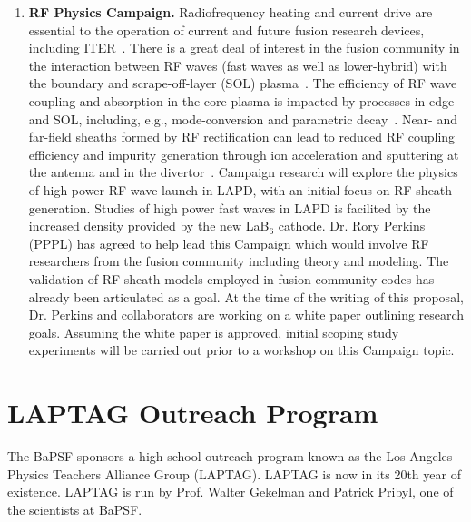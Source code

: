 \documentclass[11pt]{article}
\renewcommand{\cite}{\citep}
\begin{document}
\begin{enumerate}
\item {\bfseries RF Physics Campaign.} Radiofrequency heating and
  current drive are essential to the operation of current and future
  fusion research devices, including ITER~\cite{jaeger:2008}.  There is a great deal of
  interest in the fusion community in the interaction between RF waves
  (fast waves as well as lower-hybrid) with the boundary and
  scrape-off-layer (SOL) plasma~\cite{wallae:2011,jacquet:2011}.  The efficiency of RF wave coupling and
  absorption in the core plasma is impacted by processes in edge and
  SOL, including, e.g., mode-conversion and parametric decay~\cite{wukitch:2007,rost:2002}.  Near-
  and far-field sheaths formed by RF rectification can lead to reduced
  RF coupling efficiency and impurity generation through ion
  acceleration and sputtering at the antenna and in the divertor~\cite{ochoukov:2013,dippolito:2013}.
  Campaign research will explore the physics of high power RF wave
  launch in LAPD, with an initial focus on RF sheath generation.
  Studies of high power fast waves in LAPD is facilited by the
  increased density provided by the new LaB$_6$ cathode.  Dr. Rory
  Perkins (PPPL) has agreed to help lead this Campaign which would
  involve RF researchers from the fusion community including theory
  and modeling.  The validation of RF sheath models employed in fusion
  community codes has already been articulated as a goal.  At the time of
  the writing of this proposal, Dr. Perkins and collaborators are working on a
  white paper outlining research goals.  Assuming the white paper is
  approved, initial scoping study experiments will be carried out
  prior to a workshop on this Campaign topic.  
\end{enumerate}

\section{LAPTAG Outreach Program}

The BaPSF sponsors a high school outreach program known as the Los Angeles Physics Teachers Alliance Group  (LAPTAG).  
LAPTAG is now in its 20th year of existence.  LAPTAG is run by Prof. Walter Gekelman and Patrick Pribyl, one of the 
scientists at BaPSF.
\end{document}
